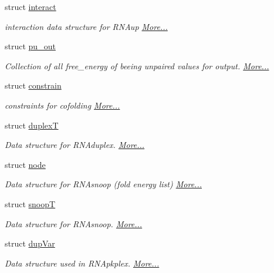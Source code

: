 \begin{DoxyCompactItemize}
struct \mbox{\hyperlink{group__data__structures_structinteract}{interact}}
\begin{DoxyCompactList}\small\item\em interaction data structure for R\+N\+Aup  \mbox{\hyperlink{group__data__structures_structinteract}{More...}}\end{DoxyCompactList}\item 
struct \mbox{\hyperlink{group__data__structures_structpu__out}{pu\+\_\+out}}
\begin{DoxyCompactList}\small\item\em Collection of all free\+\_\+energy of beeing unpaired values for output.  \mbox{\hyperlink{group__data__structures_structpu__out}{More...}}\end{DoxyCompactList}\item 
struct \mbox{\hyperlink{group__data__structures_structconstrain}{constrain}}
\begin{DoxyCompactList}\small\item\em constraints for cofolding  \mbox{\hyperlink{group__data__structures_structconstrain}{More...}}\end{DoxyCompactList}\item 
struct \mbox{\hyperlink{group__data__structures_structduplexT}{duplexT}}
\begin{DoxyCompactList}\small\item\em Data structure for R\+N\+Aduplex.  \mbox{\hyperlink{group__data__structures_structduplexT}{More...}}\end{DoxyCompactList}\item 
struct \mbox{\hyperlink{group__data__structures_structnode}{node}}
\begin{DoxyCompactList}\small\item\em Data structure for R\+N\+Asnoop (fold energy list)  \mbox{\hyperlink{group__data__structures_structnode}{More...}}\end{DoxyCompactList}\item 
struct \mbox{\hyperlink{group__data__structures_structsnoopT}{snoopT}}
\begin{DoxyCompactList}\small\item\em Data structure for R\+N\+Asnoop.  \mbox{\hyperlink{group__data__structures_structsnoopT}{More...}}\end{DoxyCompactList}\item 
struct \mbox{\hyperlink{group__data__structures_structdupVar}{dup\+Var}}
\begin{DoxyCompactList}\small\item\em Data structure used in R\+N\+Apkplex.  \mbox{\hyperlink{group__data__structures_structdupVar}{More...}}\end{DoxyCompactList}\end{DoxyCompactItemize}
